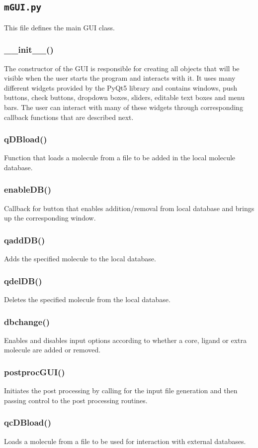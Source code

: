 \documentclass[a4paper,12pt]{assignment}
\begin{document}
\subsection{\texttt{mGUI.py}}
This file defines the main GUI class.
\subsubsection{\_\_init\_\_()}
The constructor of the GUI is responsible for creating all objects that will be visible when the user starts the program and interacts with it. It uses many different widgets provided by the PyQt5 library and contains windows, push buttons, check buttons, dropdown boxes, sliders, editable text boxes and menu bars. The user can interact with many of these widgets through corresponding callback functions that are described next.
\subsubsection{qDBload()}
Function that loads a molecule from a file to be added in the local molecule database.
\subsubsection{enableDB()}
Callback for button that enables addition/removal from local database and brings up the corresponding window.
\subsubsection{qaddDB()}
Adds the specified molecule to the local database.
\subsubsection{qdelDB()}
Deletes the specified molecule from the local database.
\subsubsection{dbchange()}
Enables and disables input options according to whether a core, ligand or extra molecule are added or removed.
\subsubsection{postprocGUI()}
Initiates the post processing by calling for the input file generation and then passing control to the post processing routines.
\subsubsection{qcDBload()}
Loads a molecule from a file to be used for interaction with external databases.
\end{document}
